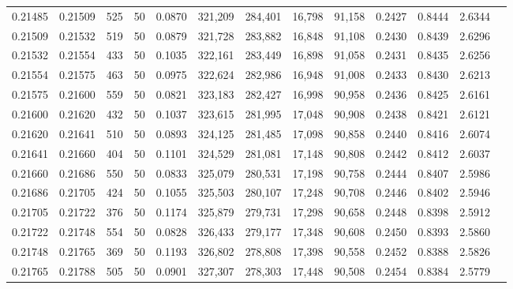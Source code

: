 \begin{tabular}{rrrrrrrrrrrrr}
0.21485 & 0.21509 &   525 &  50 &                                     0.0870 & 321,209 & 284,401 &  16,798 &  91,158 & 0.2427 & 0.8444 & 2.6344 \\
0.21509 & 0.21532 &   519 &  50 &                                     0.0879 & 321,728 & 283,882 &  16,848 &  91,108 & 0.2430 & 0.8439 & 2.6296 \\
0.21532 & 0.21554 &   433 &  50 &                                     0.1035 & 322,161 & 283,449 &  16,898 &  91,058 & 0.2431 & 0.8435 & 2.6256 \\
0.21554 & 0.21575 &   463 &  50 &                                     0.0975 & 322,624 & 282,986 &  16,948 &  91,008 & 0.2433 & 0.8430 & 2.6213 \\
0.21575 & 0.21600 &   559 &  50 &                                     0.0821 & 323,183 & 282,427 &  16,998 &  90,958 & 0.2436 & 0.8425 & 2.6161 \\
0.21600 & 0.21620 &   432 &  50 &                                     0.1037 & 323,615 & 281,995 &  17,048 &  90,908 & 0.2438 & 0.8421 & 2.6121 \\
0.21620 & 0.21641 &   510 &  50 &                                     0.0893 & 324,125 & 281,485 &  17,098 &  90,858 & 0.2440 & 0.8416 & 2.6074 \\
0.21641 & 0.21660 &   404 &  50 &                                     0.1101 & 324,529 & 281,081 &  17,148 &  90,808 & 0.2442 & 0.8412 & 2.6037 \\
0.21660 & 0.21686 &   550 &  50 &                                     0.0833 & 325,079 & 280,531 &  17,198 &  90,758 & 0.2444 & 0.8407 & 2.5986 \\
0.21686 & 0.21705 &   424 &  50 &                                     0.1055 & 325,503 & 280,107 &  17,248 &  90,708 & 0.2446 & 0.8402 & 2.5946 \\
0.21705 & 0.21722 &   376 &  50 &                                     0.1174 & 325,879 & 279,731 &  17,298 &  90,658 & 0.2448 & 0.8398 & 2.5912 \\
0.21722 & 0.21748 &   554 &  50 &                                     0.0828 & 326,433 & 279,177 &  17,348 &  90,608 & 0.2450 & 0.8393 & 2.5860 \\
0.21748 & 0.21765 &   369 &  50 &                                     0.1193 & 326,802 & 278,808 &  17,398 &  90,558 & 0.2452 & 0.8388 & 2.5826 \\
0.21765 & 0.21788 &   505 &  50 &                                     0.0901 & 327,307 & 278,303 &  17,448 &  90,508 & 0.2454 & 0.8384 & 2.5779 \\

\end{tabular}
